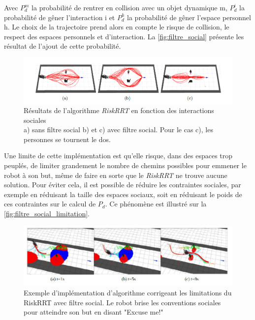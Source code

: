 Avec $P^m_d$ la probabilité de rentrer en collision avec un objet dynamique m, $P^i_d$ la probabilité de gêner l'interaction i et $P^h_d$ la probabilité de gêner l'espace personnel h. Le choix de la trajectoire prend alors en compte le risque de collision, le respect des espaces personnels et d'interaction. La \autoref{fig:filtre_social} présente les résultat de l'ajout de cette probabilité.

\begin{figure}[ht!]
    \centering
    \includegraphics[width=\linewidth]{Rapport/images/filte_social.PNG}
    \caption{Résultats de l'algorithme \textit{RiskRRT} en fonction des interactions sociales\\a) sans filtre social b) et c) avec filtre social. Pour le cas c), les personnes se tournent le dos.}
    \label{fig:filtre_social}
\end{figure}

Une limite de cette implémentation est qu'elle risque, dans des espaces trop peuplés, de limiter grandement le nombre de chemins possibles pour emmener le robot à son but, même de faire en sorte que le \textit{RiskRRT} ne trouve aucune solution. Pour éviter cela, il est possible de réduire les contraintes sociales, par exemple en réduisant la taille des espaces sociaux, soit en réduisant le poids de ces contraintes sur le calcul de $P_d$. Ce phénomène est illustré sur la \autoref{fig:filtre_social_limitation}.

\begin{figure}[ht!]
    \centering
    \includegraphics[width=\linewidth]{Rapport/images/filtre_social_limitation.PNG}
    \caption{Exemple d'implémentation d'algorithme corrigeant les limitations du RiskRRT avec filtre social. Le robot brise les conventions sociales pour atteindre son but en disant "Excuse me!"}
    \label{fig:filtre_social_limitation}
\end{figure}

